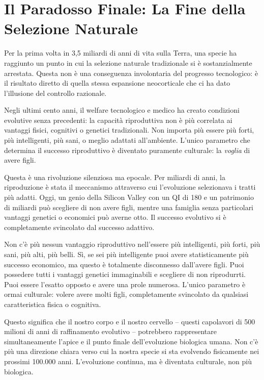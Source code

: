 \section{Il Paradosso Finale: La Fine della Selezione Naturale}

Per la prima volta in 3,5 miliardi di anni di vita sulla Terra, una specie ha raggiunto un punto in cui la selezione naturale tradizionale si è sostanzialmente arrestata. Questa non è una conseguenza involontaria del progresso tecnologico: è il risultato diretto di quella stessa espansione neocorticale che ci ha dato l'illusione del controllo razionale.

Negli ultimi cento anni, il welfare tecnologico e medico ha creato condizioni evolutive senza precedenti: la capacità riproduttiva non è più correlata ai vantaggi fisici, cognitivi o genetici tradizionali. Non importa più essere più forti, più intelligenti, più sani, o meglio adattati all'ambiente. L'unico parametro che determina il successo riproduttivo è diventato puramente culturale: la \textit{voglia} di avere figli.

Questa è una rivoluzione silenziosa ma epocale. Per miliardi di anni, la riproduzione è stata il meccanismo attraverso cui l'evoluzione selezionava i tratti più adatti. Oggi, un genio della Silicon Valley con un QI di 180 e un patrimonio di miliardi può scegliere di non avere figli, mentre una famiglia senza particolari vantaggi genetici o economici può averne otto. Il successo evolutivo si è completamente svincolato dal successo adattivo.

Non c'è più nessun vantaggio riproduttivo nell'essere più intelligenti, più forti, più sani, più alti, più belli. Sì, se sei più intelligente puoi avere statisticamente più successo economico, ma questo è totalmente disconnesso dall'avere figli. Puoi possedere tutti i vantaggi genetici immaginabili e scegliere di non riprodurrti. Puoi essere l'esatto opposto e avere una prole numerosa. L'unico parametro è ormai culturale: volere avere molti figli, completamente svincolato da qualsiasi caratteristica fisica o cognitiva.

Questo significa che il nostro corpo e il nostro cervello – questi capolavori di 500 milioni di anni di raffinamento evolutivo – potrebbero rappresentare simultaneamente l'apice e il punto finale dell'evoluzione biologica umana. Non c'è più una direzione chiara verso cui la nostra specie si sta evolvendo fisicamente nei prossimi 100.000 anni. L'evoluzione continua, ma è diventata culturale, non più biologica.

